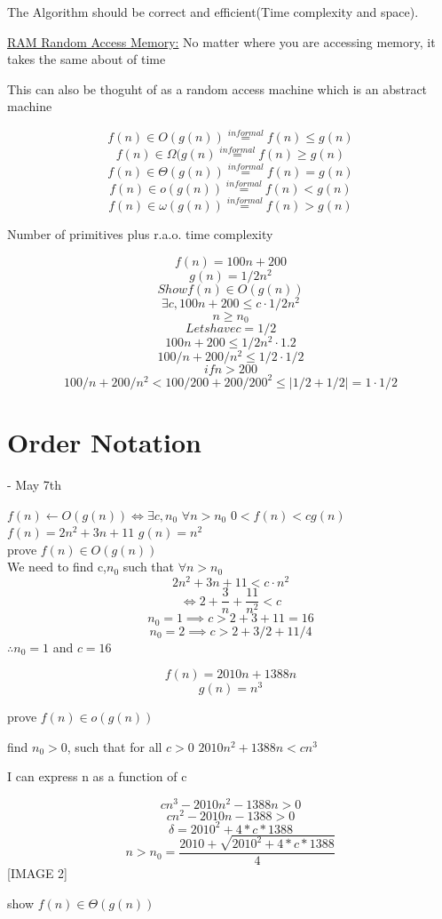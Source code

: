 \documentclass[12pt]{article}
\begin{document}
	The Algorithm should be correct and efficient(Time complexity and space).
	
	\underline{RAM Random Access Memory:} No matter where you are accessing memory, it takes the same about of time
	
	This can also be thoguht of as a random access machine which is an abstract machine
	
	$$f(n) \in O(g(n)) \overset{informal}{=} f(n) \leq g(n)$$
	$$f(n) \in \Omega(g(n) \overset{informal}{=} f(n) \geq g(n)$$
	$$f(n) \in \Theta(g(n)) \overset{informal}{=} f(n) = g(n)$$
	$$f(n) \in o(g(n)) \overset{informal}{=} f(n) < g(n)$$
	$$f(n) \in \omega(g(n)) \overset{informal}{=} f(n) > g(n)$$
	
	Number of primitives plus r.a.o. time complexity
	
	
	$$f(n) = 100n + 200$$
	$$g(n) = 1/2n^2$$
	$$Show f(n) \in O(g(n))$$
	$$\exists c, 100n + 200 \leq c \cdot 1/2n^2$$
	$$n \geq n_0$$
	$$Lets have c = 1/2$$
	$$100n + 200 \leq 1/2n^2 \cdot 1.2$$
	$$100/n + 200/n^2 \leq 1/2 \cdot 1/2$$
	$$if n > 200$$
	$$100/n + 200/n^2 < 100/200 + 200/200^2 \leq |1/2 + 1/2| = 1 \cdot 1/2$$
	
	\section*{Order Notation} - May 7th
	
	$f(n) \leftarrow O(g(n)) \iff \exists c,n_0$ $\forall n > n_0$ $0 < f(n) < cg(n)$\\
	$f(n) = 2n^2 + 3n + 11$ $g(n) = n^2$\\
	prove $f(n) \in O(g(n))$\\
	We need to find c,$n_0$ such that $\forall n > n_0$
	$$2n^2 + 3n + 11 < c \cdot n^2$$
	$$\iff 2 + \frac{3}{n} + \frac{11}{n^2} < c$$
	$$n_0 = 1 \implies c > 2 + 3 + 11 = 16$$
	$$n_0 = 2 \implies c > 2 + 3/2 + 11/4$$
	$\therefore n_0 = 1$ and $c = 16$
	
	$$f(n) = 2010n + 1388n$$
	$$g(n) = n^3$$
	
	prove $f(n) \in o(g(n))$
	
	find $n_0 > 0$, such that for all $c > 0$ $2010n^2 + 1388n < cn^3$
	
	I can express n as a function of c
	
	$$cn^3 - 2010n^2 - 1388n > 0$$
	$$cn^2 - 2010n - 1388 > 0$$
	$$\delta = 2010^2 + 4*c*1388$$
	$$n > n_0 = \frac{2010 +\sqrt{2010^2 + 4*c*1388}}{4}$$
	[IMAGE 2]
	
	show $f(n) \in \Theta(g(n))$
	
\end{document}
